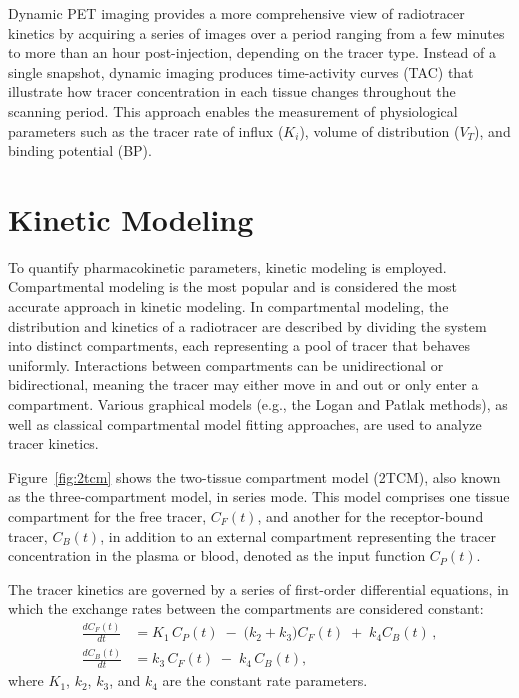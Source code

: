 Dynamic PET imaging provides a more comprehensive view of radiotracer kinetics by acquiring a series of images over a period ranging from a few minutes to more than an hour post-injection, depending on the tracer type.
Instead of a single snapshot, dynamic imaging produces time-activity curves (TAC) that illustrate how tracer concentration in each tissue changes throughout the scanning period.
This approach enables the measurement of physiological parameters such as the tracer rate of influx (\(K_i\)), volume of distribution (\(V_T\)), and binding potential (BP).

\section{Kinetic Modeling}
To quantify pharmacokinetic parameters, kinetic modeling is employed.
Compartmental modeling is the most popular and is considered the most accurate approach in kinetic modeling.
In compartmental modeling, the distribution and kinetics of a radiotracer are described by dividing the system into distinct compartments, each representing a pool of tracer that behaves uniformly.
Interactions between compartments can be unidirectional or bidirectional, meaning the tracer may either move in and out or only enter a compartment.
Various graphical models (e.g., the Logan \cite{logan1990graphical} and Patlak \cite{patlak1983graphical} methods), as well as classical compartmental model fitting approaches, are used to analyze tracer kinetics.

Figure~\ref{fig:2tcm} shows the two-tissue compartment model (2TCM), also known as the three-compartment model, in series mode.
This model comprises one tissue compartment for the free tracer, \(C_F(t)\), and another for the receptor-bound tracer, \(C_B(t)\), in addition to an external compartment representing the tracer concentration in the plasma or blood, denoted as the input function \(C_P(t)\).

The tracer kinetics are governed by a series of first-order differential equations, in which the exchange rates between the compartments are considered constant:
\begin{align}
	\frac{dC_F(t)}{dt} & = K_1 \, C_P(t) \;-\; \bigl(k_2 + k_3\bigr) C_F(t) \;+\; k_4 C_B(t) \,, \label{eq:2tcm-c1} \\[6pt]
	\frac{dC_B(t)}{dt} & = k_3 \, C_F(t) \;-\; k_4 \, C_B(t), \label{eq:2tcm-c2}
\end{align}
where \(K_1\), \(k_2\), \(k_3\), and \(k_4\) are the constant rate parameters.

